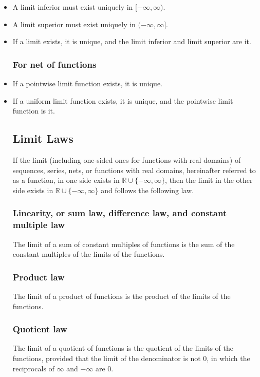 \documentclass[a4paper,12pt]{report}
\begin{document}
\begin{itemize}
\begin{itemize}
\subsubsection{For real-valued function from topological space}
\bit
\item A limit inferior must exist uniquely in $[-\infty,\infty)$.
\item A limit superior must exist uniquely in $(-\infty,\infty]$.
\item If a limit exists, it is unique, and the limit inferior and limit superior are it.
\eit
\subsubsection{For net of functions}
\bit
\item If a pointwise limit function exists, it is unique.
\item If a uniform limit function exists, it is unique, and the pointwise limit function is it.
\eit
\subsection{Limit Laws}
If the limit (including one-sided ones for functions with real domains) of sequences, series, nets, or functions with real domains, hereinafter referred to as a function, in one side exists in $\mathbb{R}\cup\{-\infty,\infty\}$, then the limit in the other side exists in $\mathbb{R}\cup\{-\infty,\infty\}$ and follows the following law.
\subsubsection{Linearity, or sum law, difference law, and constant multiple law}
The limit of a sum of constant multiples of functions is the sum of the constant multiples of the limits of the functions.
\subsubsection{Product law}
The limit of a product of functions is the product of the limits of the functions.
\subsubsection{Quotient law}
The limit of a quotient of functions is the quotient of the limits of the functions, provided that the limit of the denominator is not 0, in which the reciprocals of $\infty$ and $-\infty$ are $0$.


\end{itemize}
\end{itemize}
\end{document}
